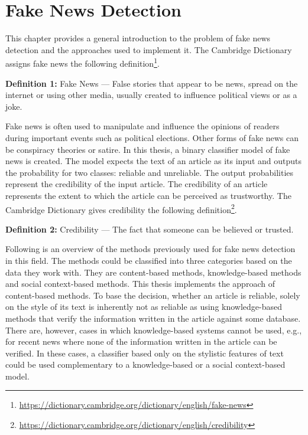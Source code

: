 \chapter{Fake News Detection}
\label{chap:definition}
This chapter provides a general introduction to the problem of fake news detection and the approaches used to implement it. The Cambridge Dictionary assigns fake news the following definition\footnote{\url{https://dictionary.cambridge.org/dictionary/english/fake-news}}.

\vspace{2mm}

\textbf{Definition 1:} Fake News --- False stories that appear to be news, spread on the internet or using other media, usually created to influence political views or as a joke.

\vspace{2mm}

Fake news is often used to manipulate and influence the opinions of readers during important events such as political elections. Other forms of fake news can be conspiracy theories or satire. 
In this thesis, a binary classifier model of fake news is created. The model expects the text of an article as its input and outputs the probability for two classes: reliable and unreliable. The output probabilities represent the credibility of the input article. The credibility of an article represents the extent to which the article can be perceived as trustworthy. The Cambridge Dictionary gives credibility the following definition\footnote{\url{https://dictionary.cambridge.org/dictionary/english/credibility}}.

\vspace{2mm}

\textbf{Definition 2:} Credibility --- The fact that someone can be believed or trusted.

\vspace{2mm}

Following is an overview of the methods previously used for fake news detection in this field. The methods could be classified into three categories based on the data they work with. They are content-based methods, knowledge-based methods and social context-based methods.
This thesis implements the approach of content-based methods. To base the decision, whether an article is reliable, solely on the style of its text is inherently not as reliable as using knowledge-based methods that verify the information written in the article against some database. There are, however, cases in which knowledge-based systems cannot be used, e.g., for recent news where none of the information written in the article can be verified. In these cases, a classifier based only on the stylistic features of text could be used complementary to a knowledge-based or a social context-based model.

